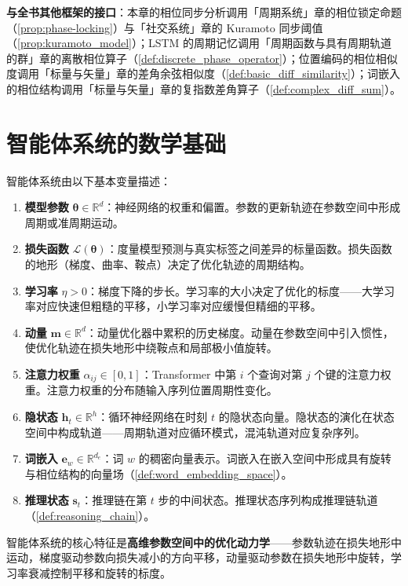 \begin{remark}
\textbf{与全书其他框架的接口}：本章的相位同步分析调用「周期系统」章的相位锁定命题（\cref{prop:phase-locking}）与「社交系统」章的 Kuramoto 同步阈值（\cref{prop:kuramoto_model}）；LSTM 的周期记忆调用「周期函数与具有周期轨道的群」章的离散相位算子（\cref{def:discrete_phase_operator}）；位置编码的相位相似度调用「标量与矢量」章的差角余弦相似度（\cref{def:basic_diff_similarity}）；词嵌入的相位结构调用「标量与矢量」章的复指数差角算子（\cref{def:complex_diff_sum}）。
\end{remark}

\section{智能体系统的数学基础}

\begin{definition}[智能体系统的基本量]\label{def:agent_quantities}
智能体系统由以下基本变量描述：
\begin{enumerate}[label=(\roman*)]
    \item \textbf{模型参数} $\boldsymbol{\theta} \in \mathbb{R}^d$：神经网络的权重和偏置。参数的更新轨迹在参数空间中形成周期或准周期运动。
    \item \textbf{损失函数} $\mathcal{L}(\boldsymbol{\theta})$：度量模型预测与真实标签之间差异的标量函数。损失函数的地形（梯度、曲率、鞍点）决定了优化轨迹的周期结构。
    \item \textbf{学习率} $\eta > 0$：梯度下降的步长。学习率的大小决定了优化的标度——大学习率对应快速但粗糙的平移，小学习率对应缓慢但精细的平移。
    \item \textbf{动量} $\mathbf{m} \in \mathbb{R}^d$：动量优化器中累积的历史梯度。动量在参数空间中引入惯性，使优化轨迹在损失地形中绕鞍点和局部极小值旋转。
    \item \textbf{注意力权重} $\alpha_{ij} \in [0,1]$：Transformer 中第 $i$ 个查询对第 $j$ 个键的注意力权重。注意力权重的分布随输入序列位置周期性变化。
    \item \textbf{隐状态} $\mathbf{h}_t \in \mathbb{R}^h$：循环神经网络在时刻 $t$ 的隐状态向量。隐状态的演化在状态空间中构成轨道——周期轨道对应循环模式，混沌轨道对应复杂序列。
    \item \textbf{词嵌入} $\mathbf{e}_w \in \mathbb{R}^{d_e}$：词 $w$ 的稠密向量表示。词嵌入在嵌入空间中形成具有旋转与相位结构的向量场（\cref{def:word_embedding_space}）。
    \item \textbf{推理状态} $\mathbf{s}_t$：推理链在第 $t$ 步的中间状态。推理状态序列构成推理链轨道（\cref{def:reasoning_chain}）。
\end{enumerate}
智能体系统的核心特征是\textbf{高维参数空间中的优化动力学}——参数轨迹在损失地形中运动，梯度驱动参数向损失减小的方向平移，动量驱动参数在损失地形中旋转，学习率衰减控制平移和旋转的标度。
\end{definition}

